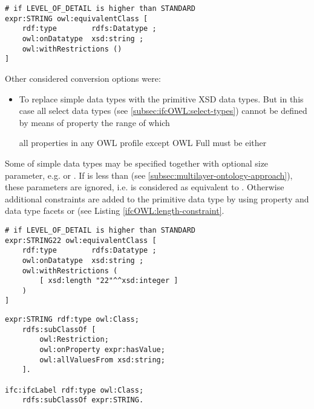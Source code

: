 \begin{lstlisting}[caption={Simple data types as instances of \name{rdfs:Datattype}},label=lst:ifcOWL-simple-types-2]
# if LEVEL_OF_DETAIL is higher than STANDARD
expr:STRING owl:equivalentClass [
    rdf:type        rdfs:Datatype ;
    owl:onDatatype  xsd:string ;
    owl:withRestrictions ()
]
\end{lstlisting}


Other considered conversion options were:
\begin{itemize}
\item To replace simple data types with the primitive XSD data types. But in this case all select data types (see \ref{subsec:ifcOWL:select-types}) cannot be defined by means of property  the range of which 

all properties in any OWL profile except OWL Full must be either 
\end{itemize}


Some of simple data types may be specified together with optional size parameter, e.g.  or . If  is less than  (see \ref{subsec:multilayer-ontology-approach}), these parameters are ignored, i.e.  is considered as equivalent to . Otherwise additional constraints are added to the primitive data type by using property  and data type facets  or  \cite{w3c:owl2-syntax,w3c:xmlschema11-2} (see Listing \ref{ifcOWL:length-constraint}. 

\begin{lstlisting}[caption={Length constraint},label=ifcOWL:length-constraint]
# if LEVEL_OF_DETAIL is higher than STANDARD
expr:STRING22 owl:equivalentClass [
    rdf:type        rdfs:Datatype ;
    owl:onDatatype  xsd:string ;
    owl:withRestrictions (
        [ xsd:length "22"^^xsd:integer ]
    )
]
\end{lstlisting}

\begin{lstlisting}[caption={},label=1]
expr:STRING rdf:type owl:Class;
    rdfs:subClassOf [
        owl:Restriction;
        owl:onProperty expr:hasValue;
        owl:allValuesFrom xsd:string;
    ].
          
ifc:ifcLabel rdf:type owl:Class;
    rdfs:subClassOf expr:STRING.
\end{lstlisting}

